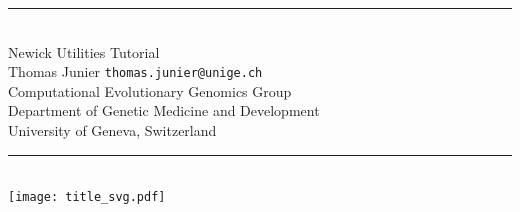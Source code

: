 \documentclass[a4paper,10pt]{report}
\theoremstyle{definition}
\theoremstyle{definition}
\newcommand{\Hrule}[1]{\rule{\linewidth}{#1}}
\begin{document}
\begin{titlepage}
\begin{center}
\Hrule{0.5mm} \\[0.8cm]
{\Huge Newick Utilities Tutorial} \\[0.5cm]
Thomas Junier \texttt{thomas.junier@unige.ch} \\
Computational Evolutionary Genomics Group \\
Department of Genetic Medicine and Development \\
University of Geneva, Switzerland
\Hrule{0.5mm}
%
\\[2cm]
\texttt{[image: title\_svg.pdf]}
\end{center}
\end{titlepage}

\tableofcontents









\appendix





% 

% 
\end{document}
